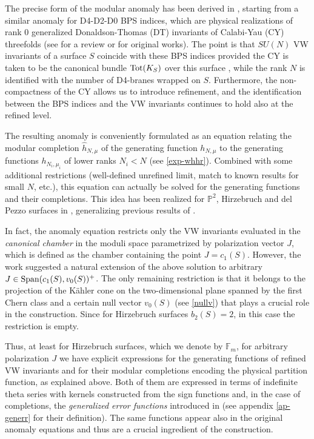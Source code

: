 \documentclass[12pt,letterpaper]{JHEP3}
\newcommand{\IF}{\mathds{F}}
\newcommand{\IP}{\mathds{P}}
\def\whh{\widehat h}
\def\nv{v_0}
\begin{document}
The precise form of the modular anomaly has been derived in \cite{Alexandrov:2019rth}, starting from a similar anomaly
for D4-D2-D0 BPS indices, which are physical realizations of rank 0 generalized Donaldson-Thomas (DT) invariants
of Calabi-Yau (CY) threefolds (see \cite{Alexandrov:2025sig} for a review or \cite{Alexandrov:2012au,Alexandrov:2016tnf,Alexandrov:2018lgp}
for original works). The point is that $SU(N)$ VW invariants of a surface $S$ coincide with these BPS indices provided the CY is taken to be 
the canonical bundle ${\rm Tot}(K_S)$ over this surface 
\cite{Minahan:1998vr,Alim:2010cf,Gholampour:2013jfa,gholampour2017localized},
while the rank $N$ is identified with the number of D4-branes wrapped on $S$.
Furthermore, the non-compactness of the CY allows us to introduce refinement, and the identification 
between the BPS indices and the VW invariants continues to hold also at the refined level.

The resulting anomaly is conveniently formulated as an equation relating the modular completion 
$\whh_{N,\mu}$ of the generating function $h_{N,\mu}$ to the generating functions $h_{N_i,\mu_i}$ of lower ranks $N_i<N$
(see \eqref{exp-whhr}).
Combined with some additional restrictions (well-defined unrefined limit, match to known results for small $N$, etc.),
this equation can actually be solved for the generating functions and their completions.
This idea has been realized for $\IP^2$, Hirzebruch and del Pezzo surfaces in \cite{Alexandrov:2020bwg,Alexandrov:2020dyy},
generalizing previous results of 
\cite{Yoshioka:1994,Yoshioka:1995,Bringmann:2010sd,Manschot:2010nc,Manschot:2011dj,Manschot:2011ym,Klemm:2012sx,
	Manschot:2014cca,Manschot:2017xcr,Beaujard:2020sgs}.

In fact, the anomaly equation restricts only the VW invariants evaluated in the {\it canonical chamber}
in the moduli space parametrized by polarization vector $J$, which is defined as the chamber containing the point $J=c_1(S)$.
However, the work \cite{Alexandrov:2020dyy} suggested a natural extension of the above solution to arbitrary $J\in\mbox{\rm Span}(c_1(S),\nv(S))^+$.
The only remaining restriction is that it belongs to the projection of the K\"ahler cone on the two-dimensional 
plane spanned by the first Chern class and a certain null vector $\nv(S)$ (see \eqref{nullv}) 
that plays a crucial role in the construction.
Since for Hirzebruch surfaces $b_2(S)=2$, in this case the restriction is empty.

Thus, at least for Hirzebruch surfaces, which we denote by $\IF_m$, for arbitrary polarization $J$ we have explicit expressions 
for the generating functions of refined VW invariants and for their modular completions encoding the physical partition function,
as explained above. Both of them are expressed in terms of indefinite theta series with kernels constructed 
from the sign functions and, in the case of completions, the {\it generalized error functions} introduced in 
\cite{Alexandrov:2016enp,Nazaroglu:2016lmr} (see appendix \ref{ap-generr} for their definition). 
The same functions appear also in the original anomaly equations 
and thus are a crucial ingredient of the construction.
\end{document}
